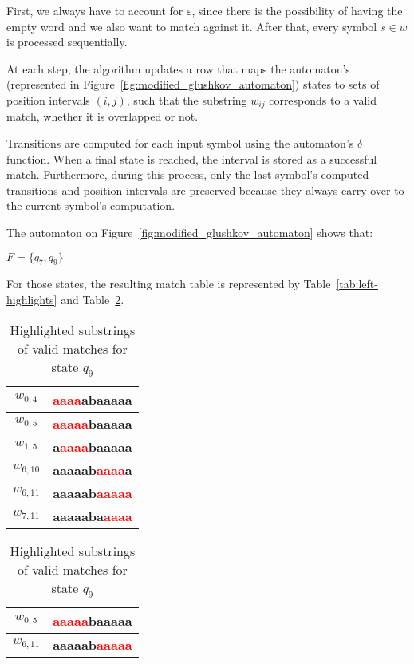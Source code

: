 First, we always have to account for $\varepsilon$, since there is the possibility of having the empty word and we also want to match against it.
After that, every symbol $s \in w$ is processed sequentially.

At each step, the algorithm updates a row that maps the automaton's (represented in Figure~\ref{fig:modified_glushkov_automaton}) states to sets of position intervals $(i,j)$, such that the substring $w_{ij}$ corresponds to a valid match, whether it is overlapped or not.

Transitions are computed for each input symbol using the automaton's $\delta$ function. When a final state is reached, the interval is stored as a successful match. Furthermore, during this process, only the last symbol's computed transitions and position intervals are preserved because they always carry over to the current symbol's computation.

The automaton on Figure~\ref{fig:modified_glushkov_automaton} shows that:

\begin{center}
	$F = \{q_7, q_9\}$
\end{center}

For those states, the resulting match table is represented by Table~\ref{tab:left-highlights} and Table~\ref{tab:left-highlights1}.

\begin{table}[H]
	\centering
	\renewcommand{\arraystretch}{1.2}
	
	\begin{minipage}[t]{0.48\textwidth}
		\caption{Highlighted substrings of valid matches for state $q_7$}
		\centering
		\begin{tabular}{|c|>{\ttfamily}l|}
			\hline
			$w_{0,4}$  & \textbf{\textcolor{red}{aaaa}}\textbf{abaaaaa} \\ \hline
			$w_{0,5}$  & \textbf{\textcolor{red}{aaaaa}}\textbf{baaaaa} \\ \hline
			$w_{1,5}$  & \textbf{a}\textbf{\textcolor{red}{aaaa}}\textbf{baaaaa} \\ \hline
			$w_{6,10}$ & \textbf{aaaaab}\textbf{\textcolor{red}{aaaa}}\textbf{a} \\ \hline
			$w_{6,11}$ & \textbf{aaaaab}\textbf{\textcolor{red}{aaaaa}} \\ \hline
			$w_{7,11}$ & \textbf{aaaaaba}\textbf{\textcolor{red}{aaaa}} \\ \hline
		\end{tabular}
		\label{tab:left-highlights}
	\end{minipage}\hfill
		\begin{minipage}[t]{0.48\textwidth}
		\caption{Highlighted substrings of valid matches for state $q_9$}
		\centering
		\begin{tabular}{|c|>{\ttfamily}l|}
			\hline
			$w_{0,5}$  & \textbf{\textcolor{red}{aaaaa}}\textbf{baaaaa} \\ \hline
			$w_{6,11}$ & \textbf{aaaaab}\textbf{\textcolor{red}{aaaaa}} \\ \hline
		\end{tabular}
		\label{tab:left-highlights1}
	\end{minipage}
\end{table}

